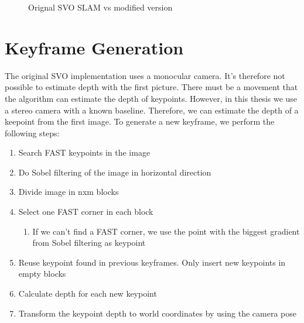 \documentclass[11pt,a4paper,titlepage,oneside]{report}
\begin{document}
\begin{figure}[H]
  \caption{Orignal SVO SLAM vs modified version}\label{fig:svo_slam}
\end{figure}

\section{Keyframe Generation}\label{sec:initialization}
The original SVO implementation uses a monocular camera. It's therefore not possible to estimate depth with the first picture. There must be a movement that the algorithm can estimate the depth of keypoints. However, in this thesis we use a stereo camera with a known baseline. Therefore, we can estimate the depth of a keepoint from the first image. To generate a new keyframe, we perform the following steps:
\begin{enumerate}
  \item{Search FAST keypoints in the image \cite{fast}}
  \item{Do Sobel filtering of the image in horizontal direction}
  \item{Divide image in nxm blocks}
  \item{Select one FAST corner in each block}
		\begin{enumerate}
			\item{If we can't find a FAST corner, we use the point with the biggest gradient from Sobel filtering as keypoint}
		\end{enumerate}
	\item{Reuse keypoint found in previous keyframes. Only insert new keypoints in empty blocks}
  \item{Calculate depth for each new keypoint}
  \item{Transform the keypoint depth to world coordinates by using the camera pose}
\end{enumerate}
\end{document}
